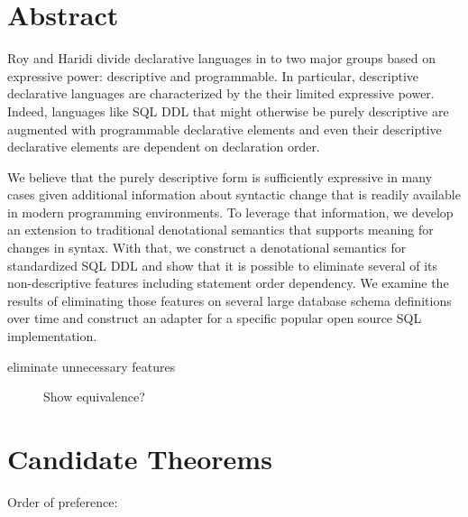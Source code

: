 \documentclass[12pt]{article}
\begin{document}
\lstset{
  language=C,
  basicstyle=\ttfamily
}


\section{Abstract}

Roy and Haridi \cite{RoyH2004} divide declarative languages in to two major groups based on expressive power: descriptive and programmable. In particular, descriptive declarative languages are characterized by the their limited expressive power. Indeed, languages like SQL DDL that might otherwise be purely descriptive are augmented with programmable declarative elements and even their descriptive declarative elements are dependent on declaration order.

We believe that the purely descriptive form is sufficiently expressive in many cases given additional information about syntactic change that is readily available in modern programming environments. To leverage that information, we develop an extension to traditional denotational semantics that supports meaning for changes in syntax. With that, we construct a denotational semantics for standardized SQL DDL and show that it is possible to eliminate several of its non-descriptive features including statement order dependency. We examine the results of eliminating those features on several large database schema definitions over time and construct an adapter for a specific popular open source SQL implementation.

\begin{description}
  \item[eliminate unnecessary features] Show equivalence?
\end{description}


\section{Candidate Theorems}
\label{sec:theorems}

Order of preference:
\end{document}
